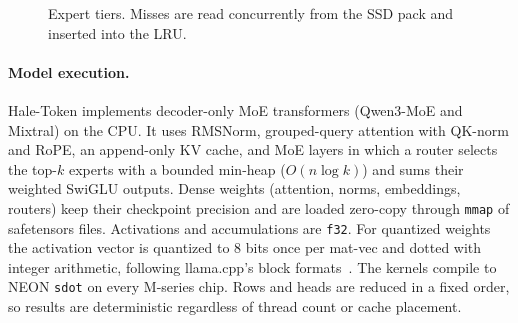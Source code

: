 \documentclass[11pt]{article}
\begin{document}
\begin{figure}[t]
\centering
{}
\caption{Expert tiers. Misses are read concurrently from the SSD pack and inserted into the LRU.}
\label{fig:tiers}
\end{figure}

\paragraph{Model execution.} Hale-Token implements decoder-only MoE transformers (Qwen3-MoE and
Mixtral) on the CPU. It uses RMSNorm, grouped-query attention with QK-norm and RoPE, an
append-only KV cache, and MoE layers in which a router selects the top-$k$ experts with a
bounded min-heap ($O(n\log k)$) and sums their weighted SwiGLU outputs. Dense weights
(attention, norms, embeddings, routers) keep their checkpoint precision and are loaded
zero-copy through \texttt{mmap} of safetensors files. Activations and accumulations are
\texttt{f32}. For quantized weights the activation vector is quantized to 8 bits once per
mat-vec and dotted with integer arithmetic, following llama.cpp's block
formats~\cite{llamacpp}. The kernels compile to NEON \texttt{sdot} on every M-series chip.
Rows and heads are reduced in a fixed order, so results are deterministic regardless of
thread count or cache placement.
\end{document}
